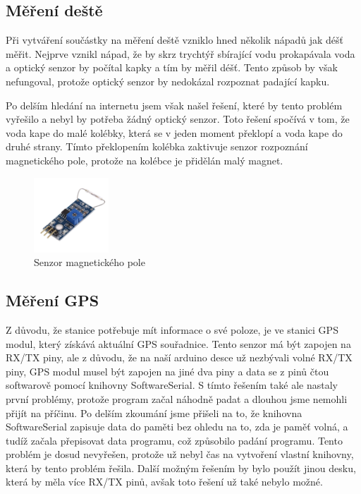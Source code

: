 \subsection{Měření deště}
Při vytváření součástky na měření deště vzniklo hned několik nápadů jak déšť měřit. Nejprve vznikl nápad,
že by skrz trychtýř sbírající vodu prokapávala voda a optický senzor by počítal kapky a tím by měřil déšť.
Tento způsob by však nefungoval, protože optický senzor by nedokázal rozpoznat padající kapku.

Po delším hledání na internetu jsem však našel řešení\cite{mereni_deste}, které by tento problém vyřešilo a nebyl by potřeba žádný optický senzor. Toto řešení spočívá v tom, že voda kape do malé kolébky, která se v jeden moment překlopí a voda kape do druhé strany.
Tímto překlopením kolébka zaktivuje senzor rozpoznání magnetického pole, protože na kolébce je přidělán malý magnet.

\begin{figure}[h] 
    \centering
    \includegraphics[width=0.25\textwidth]{images/magnet_sensor.jpg}
    \caption{Senzor magnetického pole}
\end{figure}


\subsection{Měření GPS}
Z důvodu, že stanice potřebuje mít informace o své poloze, je ve stanici GPS modul, který získává aktuální GPS souřadnice.
Tento senzor má být zapojen na RX/TX piny, ale z důvodu, že na naší arduino desce už
nezbývali volné RX/TX piny, GPS modul musel být zapojen na jiné dva piny a data se z pinů čtou softwarově pomocí knihovny SoftwareSerial.
S tímto řešením také ale nastaly první problémy, protože program začal náhodně padat a dlouhou jsme nemohli přijít na příčinu.
Po delším zkoumání jsme přišeli na to, že knihovna SoftwareSerial zapisuje data do paměti bez ohledu na to, zda je paměť volná,
a tudíž začala přepisovat data programu, což způsobilo padání programu.
Tento problém je dosud nevyřešen, protože už nebyl čas na vytvoření vlastní knihovny, která by tento problém řešila.
Další možným řešením by bylo použít jinou desku, která by měla více RX/TX pinů, avšak toto řešení už také nebylo možné.

